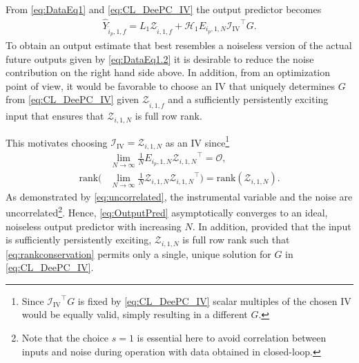 From \eqref{eq:DataEq1} and \eqref{eq:CL_DeePC_IV} the output predictor becomes
\begin{align}\label{eq:OutputPred}
    \widehat{Y}_{\hat{i}_p,1,f} = L_1 \mathcal{Z}_{\hat{i},1,f} + \mathcal{H}_1 E_{i_p,1,N}{\mathcal{I}_\mathrm{IV}}^\top G.
\end{align}
To obtain an output estimate that best resembles a noiseless version of the actual future outputs given by \eqref{eq:DataEq1.2} it is desirable to reduce the noise contribution on the right hand side above. In addition, from an optimization point of view, it would be favorable to choose an \acs{IV} that uniquely determines $G$ from \eqref{eq:CL_DeePC_IV} given $\mathcal{Z}_{\hat{i},1,f}$ and a sufficiently persistently exciting input that ensures that $\mathcal{Z}_{i,1,N}$ is full row rank.

This motivates choosing $\mathcal{I}_\mathrm{IV}=\mathcal{Z}_{i,1,N}$ as an \acs{IV} since\footnote{Since ${\mathcal{I}_\mathrm{IV}}^\top G$ is fixed by \eqref{eq:CL_DeePC_IV} scalar multiples of the chosen \ac{IV} would be equally valid, simply resulting in a different $G$.}%
\begin{align}
    &\lim_{N\rightarrow\infty} \frac{1}{N}E_{i_p,1,N}{\mathcal{Z}_{i,1,N}}^\top = \mathcal{O},\label{eq:uncorrelated}\\
    \text{rank}\biggl(&\lim_{N\rightarrow\infty} \frac{1}{N}\mathcal{Z}_{i,1,N}{\mathcal{Z}_{i,1,N}}^\top\biggl) =  \text{rank}(\mathcal{Z}_{i,1,N}).\label{eq:rankconservation}
\end{align}
As demonstrated by \eqref{eq:uncorrelated}, the instrumental variable and the noise are uncorrelated\footnote{Note that the choice $s=1$ is essential here to avoid correlation between inputs and noise during operation with data obtained in closed-loop.}. Hence, \eqref{eq:OutputPred} asymptotically converges to an ideal, noiseless output predictor with increasing $N$. In addition, provided that the input is sufficiently persistently exciting, $\mathcal{Z}_{i,1,N}$ is full row rank such that \eqref{eq:rankconservation} permits only a single, unique solution for $G$ in \eqref{eq:CL_DeePC_IV}.